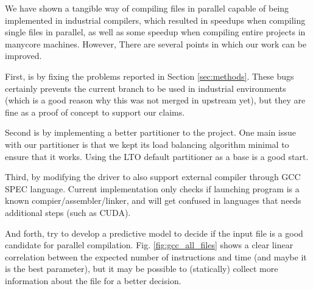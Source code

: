 \documentclass[runningheads]{llncs}
\begin{document}
We have shown a tangible way of compiling files in parallel capable
of being implemented in industrial compilers, which resulted in
speedups when compiling single files in parallel, as well as some
speedup when compiling entire projects in manycore machines. However,
There are several points in which our work can be improved.

First, is by fixing the problems reported in Section \ref{sec:methods}. These bugs
certainly prevents the current branch to be used in industrial environments (which is a
good reason why this was not merged in upstream yet), but they are fine as a
proof of concept to support our claims.

Second is by implementing a better partitioner to the project. One main issue
with our partitioner is that we kept its load balancing algorithm minimal to
ensure that it works. Using the LTO default partitioner as a base is a good start.

Third, by modifying the driver to also support external compiler through GCC
SPEC language. Current implementation only checks if launching program
is a known compier/assembler/linker, and will get confused in languages that
needs additional steps (such as CUDA).

And forth, try to develop a predictive model to decide if the input file is
a good candidate for parallel compilation. Fig. \ref{fig:gcc_all_files} shows
a clear linear correlation between the expected number of instructions and time
(and maybe it is the best parameter), but it may be possible to (statically)
collect more information about the file for a better decision.

%
%
%
% 
% 
%
%
%
%
%



\end{document}

